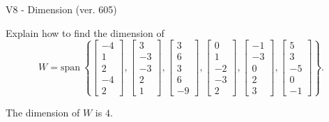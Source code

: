 \begin{exercise}
  \begin{exerciseTitle}V8 - Dimension (ver. 605)\end{exerciseTitle}
  \begin{exerciseStatement}
    Explain how to find the dimension of 
\[W=\mathrm{span}\ \left\{\left[\begin{array}{r}
-4 \\
1 \\
2 \\
-4 \\
2
\end{array}\right] , \left[\begin{array}{r}
3 \\
-3 \\
-3 \\
2 \\
1
\end{array}\right] , \left[\begin{array}{r}
3 \\
6 \\
3 \\
6 \\
-9
\end{array}\right] , \left[\begin{array}{r}
0 \\
1 \\
-2 \\
-3 \\
2
\end{array}\right] , \left[\begin{array}{r}
-1 \\
-3 \\
0 \\
2 \\
3
\end{array}\right] , \left[\begin{array}{r}
5 \\
3 \\
-5 \\
0 \\
-1
\end{array}\right]\right\}.\]



  \end{exerciseStatement}
  \begin{exerciseAnswer}
   The dimension of \(W\) is  \(4\).
  


  \end{exerciseAnswer}
\end{exercise}